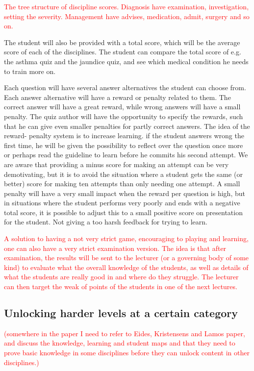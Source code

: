 \documentclass[a4paper,12pt]{book}
\begin{document}
\textcolor{red}{The tree structure of discipline scores. Diagnosis have examination, investigation, setting the severity. Management have advises, medication, admit, surgery and so on.}




The student will also be provided with a total score, which will be the average score of each of the disciplines. The student can compare the total score of e.g. the asthma quiz and the jaundice quiz, and see which medical condition he needs to train more on.

Each question will have several answer alternatives the student can choose from. Each answer alternative will have a reward or penalty related to them. The correct answer will have a great reward, while wrong answers will have a small penalty. The quiz author will have the opportunity to specify the rewards, such that he can give even smaller penalties for partly correct answers. The idea of the reward- penalty system is to increase learning. if the student answers wrong the first time, he will be given the possibility to reflect over the question once more or perhaps read the guideline to learn before he commits his second attempt. We are aware that providing a minus score for making an attempt can be very demotivating, but it is to avoid the situation where a student gets the same (or better) score for making ten attempts than only needing one attempt. A small penalty will have a very small impact when the reward per question is high, but in situations where the student performs very poorly and ends with a negative total score, it is possible to adjust this to a small positive score on presentation for the student. Not giving a too harsh feedback for trying to learn.

\textcolor{red}{A solution to having a not very strict game, encouraging to playing and learning, one can also have a very strict examination version. The idea is that after examination, the results will be sent to the lecturer (or a governing body of some kind) to evaluate what the overall knowledge of the students, as well as details of what the students are really good in and where do they struggle. The lecturer can then target the weak of points of the students in one of the next lectures. }


\subsection{Unlocking harder levels at a certain category}
\textcolor{red}{(somewhere in the paper I need to refer to Eides, Kristensens and Lamos paper, and discuss the knowledge, learning and student maps and that they need to prove basic knowledge in some disciplines before they can unlock content in other disciplines.)}
\end{document}
